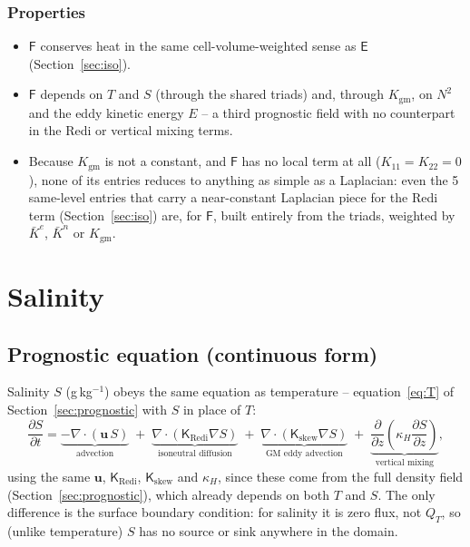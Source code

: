 \documentclass{article}
\begin{document}
\subsubsection*{Properties}
\begin{itemize}
\item $\mathsf{F}$ conserves heat in the same cell-volume-weighted sense as $\mathsf{E}$ (Section~\ref{sec:iso}).
\item $\mathsf{F}$ depends on $T$ and $S$ (through the shared triads) and, through $K_\text{gm}$, on $N^2$ and the eddy kinetic energy $E$ -- a third prognostic field with no counterpart in the Redi or vertical mixing terms.
\item Because $K_\text{gm}$ is not a constant, and $\mathsf{F}$ has no local term at all ($K_{11}=K_{22}=0$), none of its entries reduces to anything as simple as a Laplacian: even the 5 same-level entries that carry a near-constant Laplacian piece for the Redi term (Section~\ref{sec:iso}) are, for $\mathsf{F}$, built entirely from the triads, weighted by $\bar K^e$, $\bar K^n$ or $K_\text{gm}$.
\end{itemize}

\section{Salinity}\label{sec:salinity}

\subsection{Prognostic equation (continuous form)}

Salinity $S$ (g\,kg$^{-1}$) obeys the same equation as temperature -- equation~\eqref{eq:T} of Section~\ref{sec:prognostic} with $S$ in place of $T$:
\begin{equation}
\frac{\partial S}{\partial t}
= \underbrace{-\nabla \cdot \left( \mathbf{u}\, S \right)}_{\text{advection}}
\; + \; \underbrace{\nabla \cdot \left( \mathsf{K}_\text{Redi} \nabla S \right)}_{\text{isoneutral diffusion}}
\; + \; \underbrace{\nabla \cdot \left( \mathsf{K}_\text{skew} \nabla S \right)}_{\text{GM eddy advection}}
\; + \; \underbrace{\frac{\partial}{\partial z} \left( \kappa_H \frac{\partial S}{\partial z} \right)}_{\text{vertical mixing}},
\label{eq:S}
\end{equation}
using the same $\mathbf{u}$, $\mathsf{K}_\text{Redi}$, $\mathsf{K}_\text{skew}$ and $\kappa_H$, since these come from the full density field (Section~\ref{sec:prognostic}), which already depends on both $T$ and $S$.
The only difference is the surface boundary condition: for salinity it is zero flux, not $Q_T$, so (unlike temperature) $S$ has no source or sink anywhere in the domain.
\end{document}
